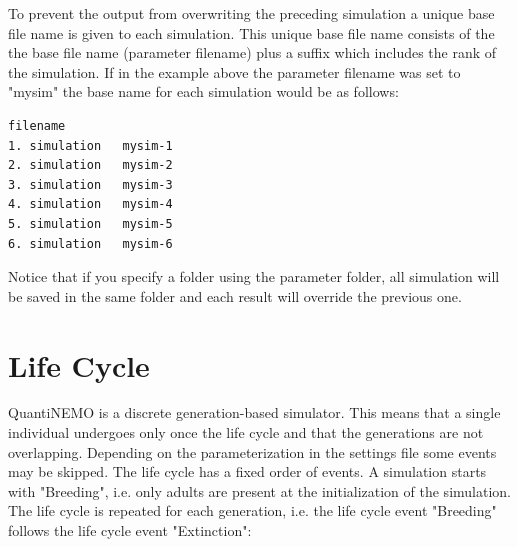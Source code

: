 \documentclass[letterpaper,12pt,oneside]{book}
\begin{document}
To prevent the output from overwriting the preceding simulation a unique base file name is given to each simulation. This unique base file name consists of the the base file name (parameter \textsf{filename}) plus a suffix which includes the rank of the simulation. If in the example above the parameter \textsf{filename} was set to "mysim" the base name for each simulation would be as follows:
\begin{lstlisting}[frame=single]
                filename
1. simulation   mysim-1
2. simulation   mysim-2
3. simulation   mysim-3
4. simulation   mysim-4
5. simulation   mysim-5
6. simulation   mysim-6
\end{lstlisting}

Notice that if you specify a folder using the parameter \textsf{folder}, all simulation will be saved in the same folder and each result will override the previous one.


\newpage
\chapter{Life Cycle}\label{chap:lifeCycle}
QuantiNEMO is a discrete generation-based simulator. This means that a single individual undergoes only once the life cycle and that the generations are not overlapping. Depending on the parameterization in the settings file some events may be skipped. The life cycle has a fixed order of events. A simulation starts with "Breeding", i.e. only adults are present at the initialization of the simulation. The life cycle is repeated for each generation, i.e. the life cycle event "Breeding" follows the life cycle event "Extinction": 
\end{document}
